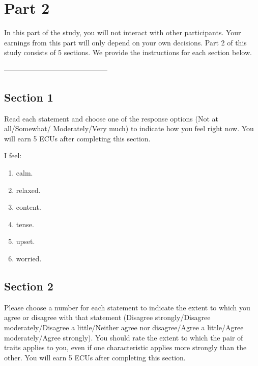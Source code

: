 \documentclass[11pt]{article}
\begin{document}
\newpage
\section*{Part 2}

In this part of the study, you will not interact with other participants. Your earnings from this part will only depend on your own decisions. Part 2 of this study consists of 5 sections. We provide the instructions for each section below.



\vspace{0.1in}
\begin{center}
--------------------------------------------
\end{center}



\subsection*{Section 1}


Read each statement and choose one of the response options (Not at all/Somewhat/ Moderately/Very much) to indicate how you feel right now. You will earn 5 ECUs after completing this section.

I feel:
\begin{enumerate}
\item calm.
  \item relaxed.
  \item  content.
  \item  tense.
  \item  upset.
  \item  worried.
\end{enumerate}

\newpage

\subsection*{Section 2}

Please choose a number for each statement to indicate the extent to which you agree or disagree with that statement (Disagree strongly/Disagree moderately/Disagree a little/Neither agree nor disagree/Agree a little/Agree moderately/Agree strongly). You should rate the extent to which the pair of traits applies to you, even if one characteristic applies more strongly than the other. You will earn 5 ECUs after completing this section.
\end{document}
